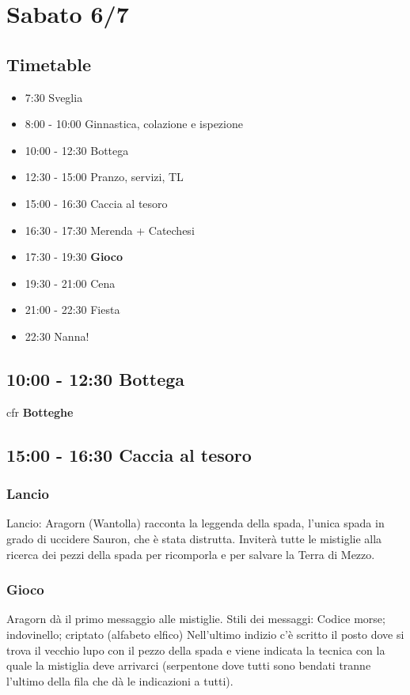 \documentclass[../main.tex]{subfiles}
\begin{document}
   \section{Sabato 6/7}
   \subsection{Timetable}
   \begin{itemize}
        \item 7:30 Sveglia
        \item 8:00 - 10:00 Ginnastica, colazione e ispezione
        \item 10:00 - 12:30 Bottega
        \item 12:30 - 15:00 Pranzo, servizi, TL
        \item 15:00 - 16:30 Caccia al tesoro
        \item 16:30 - 17:30 Merenda + Catechesi
        \item 17:30 - 19:30 \textbf{Gioco}
        \item 19:30 - 21:00 Cena
        \item 21:00 - 22:30 Fiesta
        \item 22:30 Nanna!
    \end{itemize}

   \subsection{10:00 - 12:30 Bottega}
   cfr \textbf{Botteghe}

    \subsection{15:00 - 16:30 Caccia al tesoro}
        \subsubsection{Lancio}
        Lancio: Aragorn (Wantolla) racconta la leggenda della spada, l’unica spada in grado di uccidere Sauron, che è stata distrutta. Inviterà tutte le mistiglie alla ricerca dei pezzi della spada per ricomporla e per salvare la Terra di Mezzo. 
        \subsubsection{Gioco}
        Aragorn dà il primo messaggio alle mistiglie.
Stili dei messaggi: Codice morse; indovinello; criptato (alfabeto elfico)
Nell’ultimo indizio c’è scritto il posto dove si trova il vecchio lupo con il pezzo della spada e viene indicata la tecnica con la quale la mistiglia deve arrivarci (serpentone dove tutti sono bendati tranne l’ultimo della fila che dà le indicazioni a tutti).  
\end{document}
